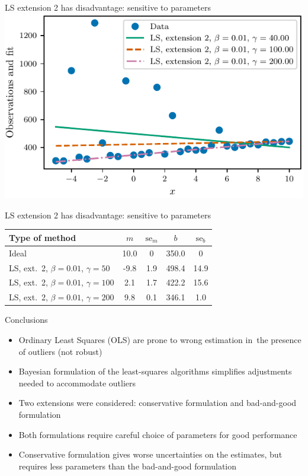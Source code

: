 \documentclass{beamer}
\begin{document}
\begin{frame}
{LS extension 2 has disadvantage: sensitive to parameters}
\vspace{1cm}
\centering
\includegraphics{fig-model-bad-and-good.pdf}
\end{frame}

\begin{frame}
{LS extension 2 has disadvantage: sensitive to parameters}
\centering
\begin{tabular}{lSSSS}
\toprule
Type of method & $m$ & $\text{se}_m$ & $b$ & $\text{se}_b$ \\
\midrule
Ideal & 10.0 & 0 & 350.0 & 0 \\
LS, ext.\ 2, $\beta = 0.01$, $\gamma = 50$ & -9.8 & 1.9 & 498.4 & 14.9 \\
LS, ext.\ 2, $\beta = 0.01$, $\gamma = 100$ & 2.1 & 1.7 & 422.2 & 15.6 \\
LS, ext.\ 2, $\beta = 0.01$, $\gamma = 200$ & 9.8 & 0.1 & 346.1 & 1.0 \\
\bottomrule
\end{tabular}
\end{frame}

\begin{frame}{Conclusions}
\begin{itemize}
    \item Ordinary Least Squares (OLS) are prone to wrong estimation 
    in~the presence of outliers (not robust)
    \item Bayesian formulation of the least-squares algorithms simplifies
    adjustments needed to accommodate outliers
    \item Two extensions were considered: conservative formulation and bad-and-good formulation
    \item Both formulations require careful choice of parameters for good performance
    \item Conservative formulation gives worse uncertainties on the estimates, but requires
    less parameters than the bad-and-good formulation
\end{itemize}
\end{frame}
\end{document}
